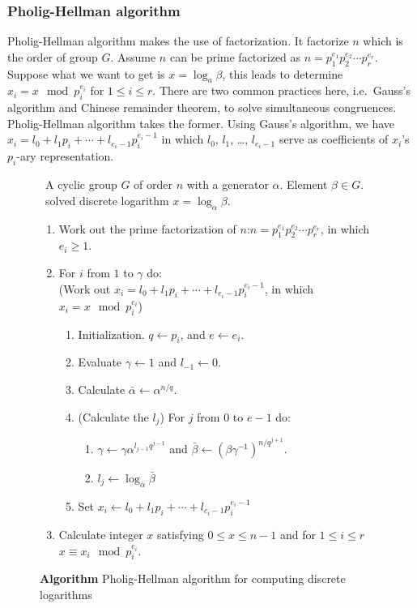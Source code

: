 \documentclass[12pt,journal,compsoc]{IEEEtran}
\begin{document}
\subsubsection{\qquad Pholig-Hellman algorithm}
\label{sec:pholig-hellman-algo}

Pholig-Hellman algorithm makes the use of factorization. It factorize
$n$ which is the order of group $G$. Assume $n$ can be prime
factorized as $n=p_{1}^{e_{1}}p_{2}^{e_{2}}\cdots
p_{r}^{e_{r}}$. Suppose what we want to get is $x=\log_{a}\beta$, this
leads to determine $x_{i}=x\mod p_{i}^{e_{i}}$ for $1\leq i\leq
r$. There are two common practices here, i.e.\ Gauss's algorithm and
Chinese remainder theorem, to solve simultaneous
congruences. Pholig-Hellman algorithm takes the former. Using Gauss's
algorithm, we have
$x_{i}=l_{0}+l_{1}p_{i}+\cdots+l_{e_{i}-1}p_{i}^{e_{i}-1}$ in which
$l_{0}$, $l_{1}$, \ldots, $l_{e_{i}-1}$ serve as coefficients of
$x_{i}$'s $p_{i}$-ary representation.
\begin{figure}[!htbp]
  \centering
  \begin{algorithmic}
  \REQUIRE~A cyclic group $G$ of order $n$ with a generator
    $\alpha$. Element $\beta\in G$.
    \ENSURE~solved discrete logarithm $x=\log_{\alpha}\beta$.
    \begin{enumerate}
    \item Work out the prime factorization of
      $n$:$n=p_{1}^{e_{1}}p_{2}^{e_{2}}\cdots p_{r}^{e_{r}}$, in which
      $e_{i}\geq 1$.
    \item For $i$ from $1$ to $\gamma$ do:\\
      (Work out
      $x_{i}=l_{0}+l_{1}p_{i}+\cdots+l_{e_{i}-1}p_{i}^{e_{i}-1}$,
      in which $x_{i}=x\mod p_{i}^{e_{i}}$)
      \begin{enumerate}
      \item Initialization. $q\leftarrow p_{i}$, and $e\leftarrow
        e_{i}$.
      \item Evaluate $\gamma\leftarrow 1$ and $l_{-1}\leftarrow 0$.
      \item Calculate $\bar{\alpha}\leftarrow\alpha^{n/q}$.
      \item (Calculate the $l_{j}$) For $j$ from $0$ to $e-1$ do:
        \begin{enumerate}
        \item $\gamma\leftarrow\gamma\alpha^{l_{j-1}q^{j-1}}$ and
          $\bar{\beta}\leftarrow{(\beta\gamma^{-1})}^{n/q^{j+1}}$.
        \item $l_{j}\leftarrow\log_{\bar{\alpha}}\bar{\beta}$
        \end{enumerate}
      \item Set $x_{i}\leftarrow
        l_{0}+l_{1}p_{i}+\cdots+l_{e_{i}-1}p_{i}^{e_{i}-1}$ 
      \end{enumerate}
    \item Calculate integer $x$ satisfying $0\leq x\leq n-1$ and for
      $1\leq i\leq r$ $x\equiv x_{i}\mod p_{i}^{e_{i}}$.
    \end{enumerate}
  \end{algorithmic}
  \caption{\textbf{Algorithm} Pholig-Hellman algorithm for computing discrete logarithms}
  \label{fig:pholig-hellman-algo}
\end{figure}
\end{document}
